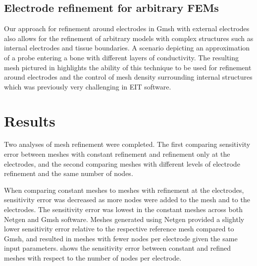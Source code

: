 \subsection{Electrode refinement for arbitrary FEMs}
Our approach for refinement around electrodes in Gmsh with external electrodes 
also allows for the refinement of arbitrary models with complex structures
such as internal electrodes and tissue boundaries.
A scenario depicting an approximation of 
a probe entering a bone with different 
layers of conductivity. The resulting mesh pictured in 
highlights the ability of this technique
to be used for refinement around electrodes and the control of mesh density  
surrounding internal structures which was previously
very challenging in EIT software.

\section{Results}

Two analyses of mesh refinement were completed. The first comparing sensitivity error between
meshes with constant refinement and refinement only at the electrodes, and the second 
comparing meshes with different levels of electrode refinement and the same number of nodes.

When comparing constant meshes to meshes with refinement at the electrodes, sensitivity error
was decreased as more nodes were added to the mesh and to the electrodes. The sensitivity
error was lowest in the constant meshes across both Netgen and Gmsh software. Meshes 
generated using Netgen
provided a slightly lower sensitivity error relative to the respective reference mesh
compared to Gmsh, and resulted in meshes with fewer nodes per electrode given the same input
parameters.  shows the sensitivity error between
constant and refined meshes with respect to the number of nodes per electrode.  

